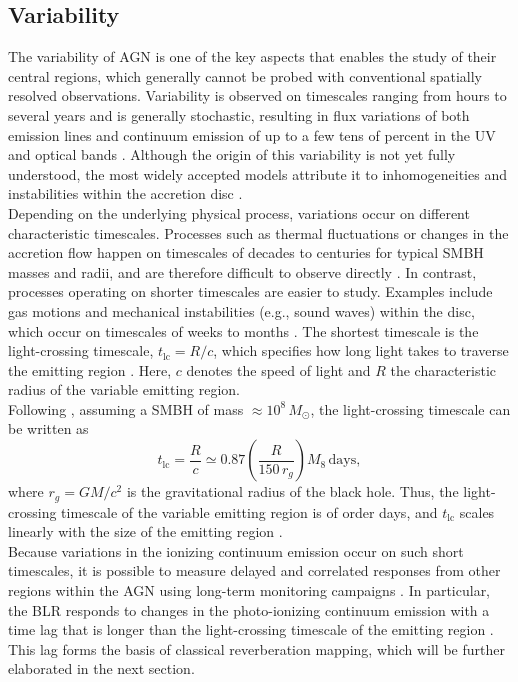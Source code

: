 \subsection{Variability}
\label{sec:variability}

The variability of AGN is one of the key aspects that enables the study of their central regions, which generally cannot be probed with conventional spatially resolved observations. Variability is observed on timescales ranging from hours to several years and is generally stochastic, resulting in flux variations of both emission lines and continuum emission of up to a few tens of percent in the UV and optical bands \parencite{Ulrich1997}. Although the origin of this variability is not yet fully understood, the most widely accepted models attribute it to inhomogeneities and instabilities within the accretion disc \parencite{Ulrich1997, Dexter_2010}. \\
Depending on the underlying physical process, variations occur on different characteristic timescales. Processes such as thermal fluctuations or changes in the accretion flow happen on timescales of decades to centuries for typical SMBH masses and radii, and are therefore difficult to observe directly \parencite{ricci2022changinglook}. In contrast, processes operating on shorter timescales are easier to study. Examples include gas motions and mechanical instabilities (e.g., sound waves) within the disc, which occur on timescales of weeks to months \parencite{ricci2022changinglook}. 
The shortest timescale is the light-crossing timescale, $t_\mathrm{lc} = R/c$, which specifies how long light takes to traverse the emitting region  \parencite{ricci2022changinglook}. Here, $c$ denotes the speed of light and $R$ the characteristic radius of the variable emitting region. \\
Following \cite{ricci2022changinglook}, assuming a SMBH of mass $\approx 10^8\,M_\odot$, the light-crossing timescale can be written as
\begin{equation}
	t_\mathrm{lc} = \frac{R}{c} \simeq 0.87 \left(\frac{R}{150\,r_g}\right)M_8\,\mathrm{days},
\end{equation}
where $r_g = GM/c^2$ is the gravitational radius of the black hole. Thus, the light-crossing timescale of the variable emitting region is of order days, and $t_\mathrm{lc}$ scales linearly with the size of the emitting region \parencite{ricci2022changinglook}.\\
Because variations in the ionizing continuum emission occur on such short timescales, it is possible to measure delayed and correlated responses from other regions within the AGN using long-term monitoring campaigns \parencite{peterson1997introduction}. In particular, the BLR responds to changes in the photo-ionizing continuum emission with a time lag that is longer than the light-crossing timescale of the emitting region \parencite{peterson1997introduction}. This lag forms the basis of classical reverberation mapping, which will be further elaborated in the next section.




